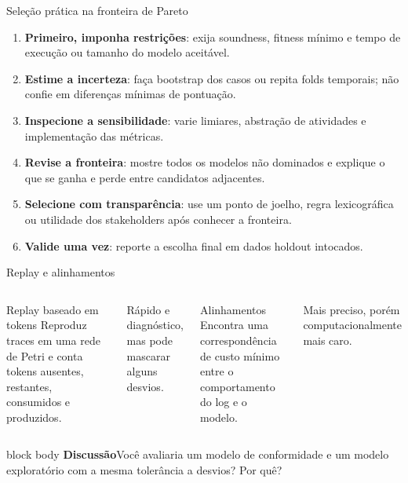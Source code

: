 \documentclass[aspectratio=169,11pt]{beamer}
\newcommand{\promptbox}[1]{%
  \begin{beamercolorbox}[rounded=true,sep=0.65em]{block body}
    \textbf{\color{Coral}Discussão}\quad #1
  \end{beamercolorbox}
}
\begin{document}
\begin{frame}{Seleção prática na fronteira de Pareto}
  \begin{enumerate}
    \item \textbf{Primeiro, imponha restrições}: exija soundness, fitness mínimo e tempo de execução ou tamanho do modelo aceitável.
    \item \textbf{Estime a incerteza}: faça bootstrap dos casos ou repita folds temporais; não confie em diferenças mínimas de pontuação.
    \item \textbf{Inspecione a sensibilidade}: varie limiares, abstração de atividades e implementação das métricas.
    \item \textbf{Revise a fronteira}: mostre todos os modelos não dominados e explique o que se ganha e perde entre candidatos adjacentes.
    \item \textbf{Selecione com transparência}: use um ponto de joelho, regra lexicográfica ou utilidade dos stakeholders após conhecer a fronteira.
    \item \textbf{Valide uma vez}: reporte a escolha final em dados holdout intocados.
  \end{enumerate}
\end{frame}

\begin{frame}{Replay e alinhamentos}
  \begin{columns}[T,onlytextwidth]
      \begin{block}{Replay baseado em tokens}
        Reproduz traces em uma rede de Petri e conta tokens ausentes, restantes, consumidos e produzidos.
      \end{block}
      Rápido e diagnóstico, mas pode mascarar alguns desvios.
      \begin{block}{Alinhamentos}
        Encontra uma correspondência de custo mínimo entre o comportamento do log e o modelo.
      \end{block}
      Mais preciso, porém computacionalmente mais caro.
  \end{columns}
  \vspace{0.55cm}
  \promptbox{Você avaliaria um modelo de conformidade e um modelo exploratório com a mesma tolerância a desvios? Por quê?}
\end{frame}
\end{document}
